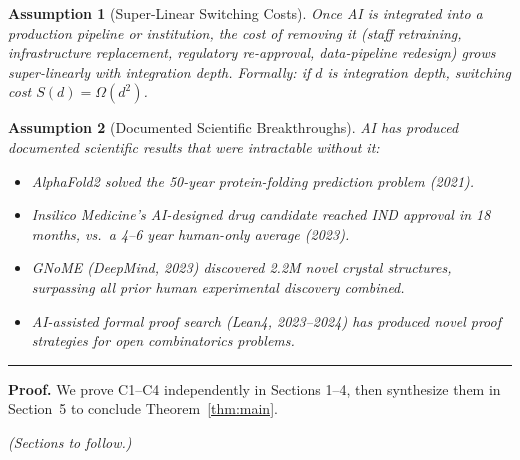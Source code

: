 \documentclass[12pt]{article}
\newtheorem{assumption}{Assumption}
\begin{document}
\begin{assumption}[Super-Linear Switching Costs]\label{A4}
  Once AI is integrated into a production pipeline or institution, the cost
  of removing it (staff retraining, infrastructure replacement, regulatory
  re-approval, data-pipeline redesign) grows super-linearly with integration
  depth.  Formally: if $d$ is integration depth, switching cost $S(d) = \Omega(d^2)$.
\end{assumption}

\begin{assumption}[Documented Scientific Breakthroughs]\label{A5}
  AI has produced documented scientific results that were intractable without it:
  \begin{itemize}
    \item AlphaFold2 solved the 50-year protein-folding prediction problem (2021).
    \item Insilico Medicine's AI-designed drug candidate reached IND approval
      in 18 months, vs.\ a 4--6 year human-only average (2023).
    \item GNoME (DeepMind, 2023) discovered 2.2M novel crystal structures,
      surpassing all prior human experimental discovery combined.
    \item AI-assisted formal proof search (Lean4, 2023--2024) has produced
      novel proof strategies for open combinatorics problems.
  \end{itemize}
\end{assumption}

\bigskip\hrule\bigskip

\textbf{Proof.} We prove C1--C4 independently in Sections 1--4, then
synthesize them in Section~5 to conclude Theorem~\ref{thm:main}.

\bigskip
\textit{(Sections to follow.)}
\end{document}
